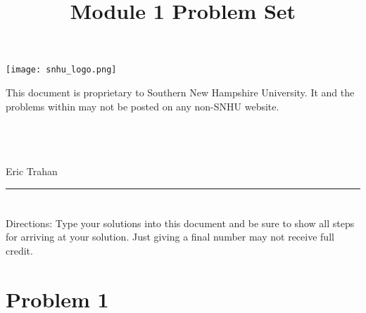 \documentclass{amsart}
\theoremstyle{definition}
\theoremstyle{Exercise}
\theoremstyle{remark}
\theoremstyle{rule}
\numberwithin{equation}{section}
\begin{document}
\title{\sf Module 1 Problem Set}%





\begin{center}
\texttt{[image: snhu\_logo.png]}
\end{center}

\maketitle
This document is proprietary to Southern New Hampshire University. It and the problems within may not be posted on any non-SNHU website.
\\\\\\\\
\begin{center}
Eric Trahan
\end{center}

\begin{center}
\rule{\textwidth}{0.4pt}
\end{center}
\newpage


\section*{}


\section*{}
Directions: Type your solutions into this document and be sure to show all steps for arriving at your solution. Just giving a final number may not receive full credit.
\\

\section*{Problem 1}
\end{document}
